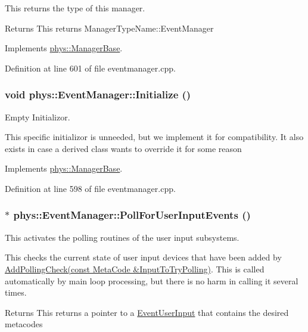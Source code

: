 This returns the type of this manager. 

\begin{DoxyReturn}{Returns}
This returns ManagerTypeName::EventManager 
\end{DoxyReturn}


Implements \hyperlink{classphys_1_1ManagerBase_aff400b6599db635e24796d8221e9a0e3}{phys::ManagerBase}.



Definition at line 601 of file eventmanager.cpp.

\hypertarget{classphys_1_1EventManager_a51afdd83f44f461dfac5c9eca5883ea0}{
\subsubsection[{Initialize}]{\setlength{\rightskip}{0pt plus 5cm}void phys::EventManager::Initialize ()}}
\label{da/dde/classphys_1_1EventManager_a51afdd83f44f461dfac5c9eca5883ea0}


Empty Initializor. 

This specific initializor is unneeded, but we implement it for compatibility. It also exists in case a derived class wants to override it for some reason 

Implements \hyperlink{classphys_1_1ManagerBase_a57dd8e54e767427d5bdcc86dc66d73ed}{phys::ManagerBase}.



Definition at line 598 of file eventmanager.cpp.

\hypertarget{classphys_1_1EventManager_a983bc9f1933466491e6bf025b26a9023}{
\subsubsection[{PollForUserInputEvents}]{ $\ast$ phys::EventManager::PollForUserInputEvents ()}}
\label{da/dde/classphys_1_1EventManager_a983bc9f1933466491e6bf025b26a9023}


This activates the polling routines of the user input subsystems. 

This checks the current state of user input devices that have been added by \hyperlink{classphys_1_1EventManager_a6ff66883358344908afd11204f79f196}{AddPollingCheck(const MetaCode \&InputToTryPolling)}. This is called automatically by main loop processing, but there is no harm in calling it several times. \begin{DoxyReturn}{Returns}
This returns a pointer to a \hyperlink{classphys_1_1EventUserInput}{EventUserInput} that contains the desired metacodes 
\end{DoxyReturn}


